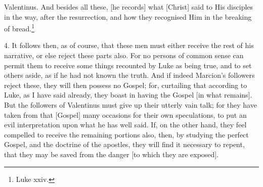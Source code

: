 Valentinus. And besides all these, [he records] what [Christ] said to His disciples in the way, after the resurrection, and how they recognised Him in the breaking of bread.\footnote{Luke xxiv.}

4. It follows then, as of course, that these men must either receive the rest of his narrative, or else reject these parts also. For no persons of common sense can permit them to receive some things recounted by Luke as being true, and to set others aside, as if he had not known the truth. And if indeed Marcion’s followers reject these, they will then possess no Gospel; for, curtailing that according to Luke, as I have said already, they boast in having the Gospel [in what remains]. But the followers of Valentinus must give up their utterly vain talk; for they have taken from that [Gospel] many occasions for their own speculations, to put an evil interpretation upon what he has well said. If, on the other hand, they feel compelled to receive the remaining portions also, then, by studying the perfect Gospel, and the doctrine of the apostles, they will find it necessary to repent, that they may be saved from the danger [to which they are exposed].


